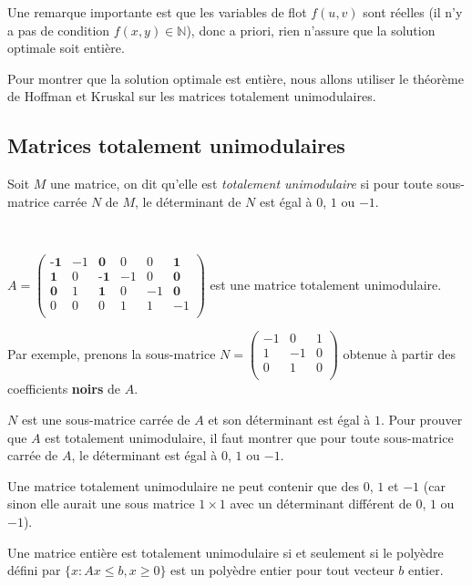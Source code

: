 \documentclass[a4paper]{article}
\begin{document}
\begin{remark}
	Une remarque importante est que les variables de flot $f(u, v)$ sont réelles (il n'y a pas de condition $f(x,y)\in \mathbb{N}$), donc a priori, rien n'assure que la solution optimale soit entière.
\end{remark}

Pour montrer que la solution optimale est entière, nous allons utiliser le théorème de Hoffman et Kruskal sur les matrices totalement unimodulaires.
\subsection{Matrices totalement unimodulaires}
\begin{definition}
Soit $M$ une matrice, on dit qu'elle est \emph{totalement unimodulaire} si pour toute sous-matrice carrée $N$ de $M$, le déterminant de $N$ est égal à $0$, $1$ ou $-1$.
\end{definition}
\begin{eg}\,

	$A = \begin{pmatrix}
	\textbf{-1} & -1 & \textbf{0} & 0 & 0 & \textbf{1} \\
	\textbf{1} & 0 & \textbf{-1} & -1 & 0 & \textbf{0} \\
	\textbf{0} & 1 & \textbf{1} & 0 & -1 & \textbf{0} \\
	0 & 0 & 0 & 1 & 1 & -1 \\
	\end{pmatrix}$ est une matrice totalement unimodulaire.

	Par exemple, prenons la sous-matrice $N = \begin{pmatrix}
	-1 & 0 & 1 \\
	1 & -1 & 0 \\
	0 & 1 & 0 \\
	\end{pmatrix}$ obtenue à partir des coefficients \textbf{noirs} de $A$.

	$N$ est une sous-matrice carrée de $A$ et son déterminant est égal à $1$. Pour prouver que $A$ est totalement unimodulaire, il faut montrer que pour toute sous-matrice carrée de $A$, le déterminant est égal à $0$, $1$ ou $-1$.
\end{eg}
\begin{remark}
	Une matrice totalement unimodulaire ne peut contenir que des $0$, $1$ et $-1$ (car sinon elle aurait une sous matrice $1\times 1$ avec un déterminant différent de $0$, $1$ ou $-1$).
\end{remark}
\begin{theorem}
Une matrice entière est totalement unimodulaire si et seulement si le polyèdre défini par $\{x : Ax \leq b, x \geq 0\}$ est un polyèdre entier pour tout vecteur $b$ entier.
\end{theorem}
\end{document}

